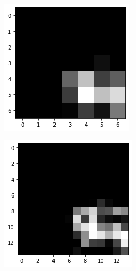 \documentclass[10pt,twocolumn,hidelinks,letterpaper]{article}
\begin{document}
\begin{figure}[t]
\begin{subfigure}{.57\linewidth}
\begin{subfigure}{.32\linewidth}
  	\end{subfigure}
  	\begin{subfigure}{.32\linewidth}
  		\includegraphics[width=\linewidth]{images/mmaps_example/downsampling7x7_gray.png}
  	\end{subfigure}
  	\begin{subfigure}{.32\linewidth}
  		\includegraphics[width=\linewidth]{images/mmaps_example/downsampling14x14_gray.png}

\end{subfigure}
\end{subfigure}
\end{figure}
\end{document}
